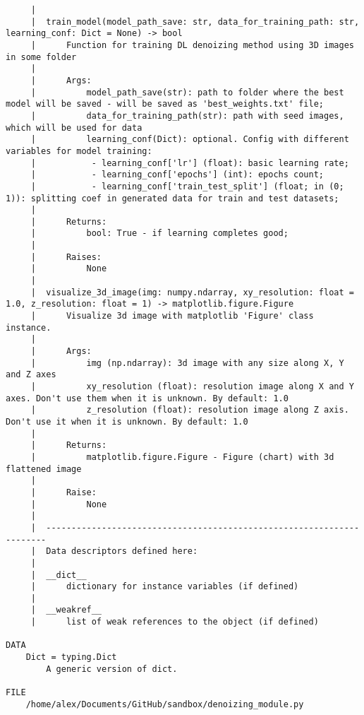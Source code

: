 \begin{lstlisting}
     |  
     |  train_model(model_path_save: str, data_for_training_path: str, learning_conf: Dict = None) -> bool
     |      Function for training DL denoizing method using 3D images in some folder
     |      
     |      Args:
     |          model_path_save(str): path to folder where the best model will be saved - will be saved as 'best_weights.txt' file;
     |          data_for_training_path(str): path with seed images, which will be used for data
     |          learning_conf(Dict): optional. Config with different variables for model training:
     |           - learning_conf['lr'] (float): basic learning rate;
     |           - learning_conf['epochs'] (int): epochs count;
     |           - learning_conf['train_test_split'] (float; in (0; 1)): splitting coef in generated data for train and test datasets;
     |      
     |      Returns:
     |          bool: True - if learning completes good;
     |      
     |      Raises:
     |          None
     |  
     |  visualize_3d_image(img: numpy.ndarray, xy_resolution: float = 1.0, z_resolution: float = 1) -> matplotlib.figure.Figure
     |      Visualize 3d image with matplotlib 'Figure' class instance.
     |      
     |      Args:
     |          img (np.ndarray): 3d image with any size along X, Y and Z axes
     |          xy_resolution (float): resolution image along X and Y axes. Don't use them when it is unknown. By default: 1.0
     |          z_resolution (float): resolution image along Z axis. Don't use it when it is unknown. By default: 1.0
     |      
     |      Returns:
     |          matplotlib.figure.Figure - Figure (chart) with 3d flattened image
     |      
     |      Raise:
     |          None
     |  
     |  ----------------------------------------------------------------------
     |  Data descriptors defined here:
     |  
     |  __dict__
     |      dictionary for instance variables (if defined)
     |  
     |  __weakref__
     |      list of weak references to the object (if defined)

DATA
    Dict = typing.Dict
        A generic version of dict.

FILE
    /home/alex/Documents/GitHub/sandbox/denoizing_module.py	
\end{lstlisting}

